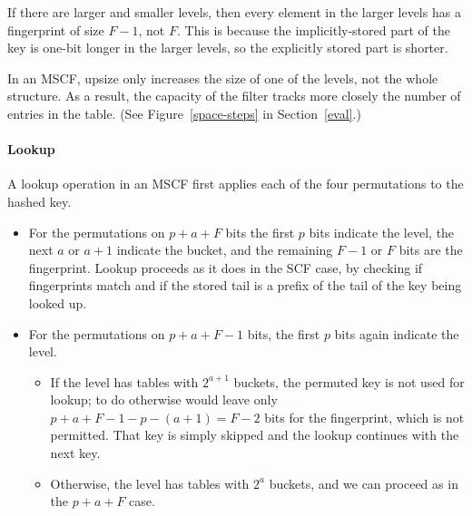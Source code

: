\documentclass[letterpaper,twocolumn,10pt]{article}
\newcommand{\ints}{\mathbb{Z}}
\newcommand{\TCF}{SCF}
\newcommand{\MTCF}{MSCF}
\newcommand{\TCF}{TCF}
\newcommand{\MTCF}{MTCF}
\begin{document}
If there are larger and smaller levels, then every element in the larger levels has a fingerprint of size $F-1$, not $F$.
This is because the implicitly-stored part of the key is one-bit longer in the larger levels, so the explicitly stored part is shorter.

In an \MTCF{}, upsize only increases the size of one of the levels, not the whole structure.
As a result, the capacity of the filter tracks more closely the number of entries in the table. (See Figure~\ref{space-steps} in Section~\ref{eval}.)

\paragraph{Lookup}
A lookup operation in an \MTCF{} first applies each of the four permutations to the hashed key.
\begin{itemize}
\item For the permutations on $p + a + F$ bits %
the first $p$ bits indicate the level, %
the next $a$ or $a+1$ indicate the bucket, %
and the remaining $F-1$ or $F$ bits are the fingerprint.
Lookup proceeds as it does in the \TCF{} case, by checking if fingerprints match and if the stored tail is a prefix of the tail of the key being looked up. %
\item For the permutations on $p + a + F - 1$ bits, the first $p$ bits again indicate the level. %
\begin{itemize}
\item If the level has tables with $2^{a+1}$ buckets, the permuted key is not used for lookup; to do otherwise would leave only $p + a + F - 1 - p - (a+1) = F-2$ bits for the fingerprint, which is not permitted.
That key is simply skipped and the lookup continues with the next key. %
\item Otherwise, the level has tables with $2^a$ buckets, and we can proceed as in the $p+a+F$ case. %
\end{itemize}
\end{itemize}

\end{document}
